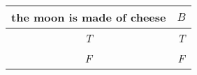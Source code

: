 
\begin{center}
\begin{tabular}{c||c}
 the moon is made of cheese & $B$ \\
\hline
\emph{T} & \emph{T}  \\
\emph{F} & \emph{F} \\
\end{tabular}
\end{center}

